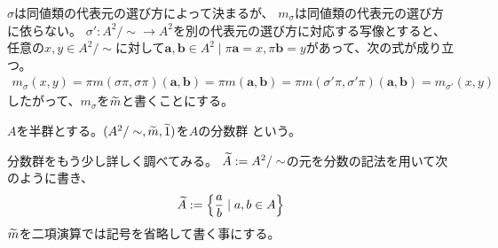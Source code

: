 	$\sigma$は同値類の代表元の選び方によって決まるが、
	$m_\sigma$は同値類の代表元の選び方に依らない。
	$\sigma':A^2/\sim\to A^2$を別の代表元の選び方に対応する写像とすると、
	任意の$x,y\in A^2/\sim$に対して$\mathbf{a},\mathbf{b}\in A^2
	\mid \pi\mathbf{a}=x,\pi\mathbf{b}=y$があって、次の式が成り立つ。
	\begin{equation*}\begin{split}
		m_\sigma(x,y) = \pi m(\sigma\pi,\sigma\pi)(\mathbf{a},\mathbf{b})
		= \pi m(\mathbf{a},\mathbf{b})
		= \pi m(\sigma'\pi,\sigma'\pi)(\mathbf{a},\mathbf{b}) = m_{\sigma'}(x,y)
	\end{split}\end{equation*}
	したがって、$m_\sigma$を${\widetilde{m}}$と書くことにする。

	\begin{definition}[分数群]\label{def:分数群} %
		$A$を半群とする。$(A^2/\sim,{\widetilde{m}},{\widetilde{1}})$を$A$の分数群
		という。\EOP
	\end{definition} %

	分数群をもう少し詳しく調べてみる。
	${\widetilde{A}}:=A^2/\sim$の元を分数の記法を用いて次のように書き、
	\begin{equation*}\begin{split}
		{\widetilde{A}} := \mathinner{\left\{{\frac{a}{b}\mid a,b\in A}\right\}}
	\end{split}\end{equation*}
	${\widetilde{m}}$を二項演算では記号を省略して書く事にする。

